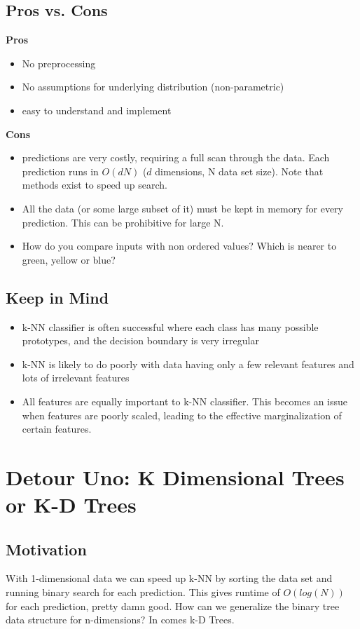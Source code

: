 \documentclass[10pt]{article}
\begin{document}
	\subsection*{Pros vs. Cons}
		\noindent \textbf{Pros} 
		\begin{itemize}
			\item No preprocessing 
			\item No assumptions for underlying distribution (non-parametric)
			\item easy to understand and implement
		\end{itemize}
		
		\noindent \textbf{Cons}
		\begin{itemize}
			\item predictions are very costly, requiring a full scan through the data. Each prediction runs in
				$O(dN)$ ($d$ dimensions, N data set size). Note that methods exist to speed up search.
			\item All the data (or some large subset of it) must be kept in memory for every prediction. This
				can be prohibitive for large N.
			\item How do you compare inputs with non ordered values? Which is nearer to green, yellow or 
				blue? 
		\end{itemize}
	
	\subsection*{Keep in Mind}
		\begin{itemize}
			\item k-NN classifier is often successful where each class has many possible prototypes, and the 
				decision boundary is very irregular
			\item k-NN is likely to do poorly with data having only a few relevant features and lots of irrelevant features 
			\item All features are equally important to k-NN classifier. This becomes an issue when features are 
			poorly scaled, leading to the effective marginalization of certain features. 
		\end{itemize}
	
		
\section*{Detour Uno: K Dimensional Trees  or K-D Trees }
	\subsection*{Motivation}
		With 1-dimensional data we can speed up k-NN by sorting the data set and running binary search for 
		each prediction. This gives runtime of $O(log(N))$ for each prediction, pretty damn good.  How can we 
		generalize the binary tree data structure for n-dimensions? In comes k-D Trees. 
\end{document}

